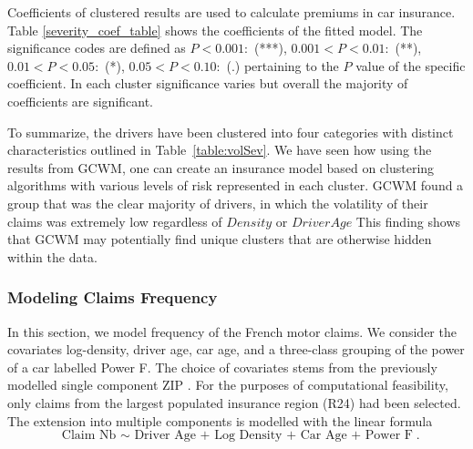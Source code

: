 \documentclass[11pt,letterpaper]{article}
\numberwithin{equation}{section}
\numberwithin{equation}{section}
\numberwithin{equation}{section}
\begin{document}
Coefficients of clustered results are used to calculate premiums in car insurance. Table \ref{severity_coef_table} shows the coefficients of the fitted model. The significance codes are defined as $  P < 0.001 : $  (***), $0.001 < P < 0.01:$ (**), $  0.01 < P < 0.05:$ (*), $0.05 < P < 0.10 : $ (.) %
pertaining to the $P$ value of the specific coefficient. In each cluster significance varies but overall the majority of coefficients are significant.

To summarize, the drivers have been clustered into four categories with distinct characteristics outlined in Table~\ref{table:volSev}. We have seen how using the results from GCWM, one can create an insurance model based on clustering algorithms with various levels of risk represented in each cluster. GCWM found a group that was the clear majority of drivers, in which the volatility of their claims was extremely low regardless of $Density$ or $DriverAge$ This finding shows that GCWM may potentially find unique clusters that are otherwise hidden within the data.


 \subsubsection{Modeling Claims Frequency}

In this section, we model frequency of the French motor claims. We consider the covariates log-density, driver age, car age, and a three-class grouping of the power of a car labelled Power F. The choice of covariates stems from the previously modelled single component ZIP \citep{Charpentier:2014}. For the purposes of computational feasibility, only claims from the largest populated insurance region (R24) had been selected. %
The extension into multiple components is modelled with the linear formula
$$ \text{ Claim Nb $\sim$  Driver Age + Log Density + Car Age + Power F}. $$%
\end{document}
